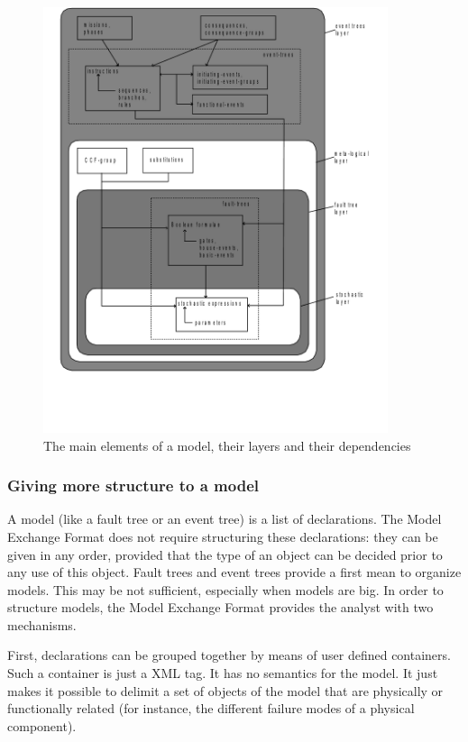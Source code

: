 \documentclass[11pt]{article}
\begin{document}
\begin{figure}[htbp]

\includegraphics[width=0.9\textwidth]{./word/media/image4.png}
\caption{\label{fig:org6865508}
The main elements of a model, their layers and their dependencies}
\end{figure}

\subsubsection{Giving more structure to a model}
\label{sec:orgdee7e83}

A model (like a fault tree or an event tree) is a list of declarations.
The Model Exchange Format does not require structuring these
declarations: they can be given in any order, provided that the type of
an object can be decided prior to any use of this object. Fault trees
and event trees provide a first mean to organize models. This may be not
sufficient, especially when models are big. In order to structure
models, the Model Exchange Format provides the analyst with two
mechanisms.

First, declarations can be grouped together by means of user defined
containers. Such a container is just a XML tag. It has no semantics for
the model. It just makes it possible to delimit a set of objects of the
model that are physically or functionally related (for instance, the
different failure modes of a physical component).
\end{document}
